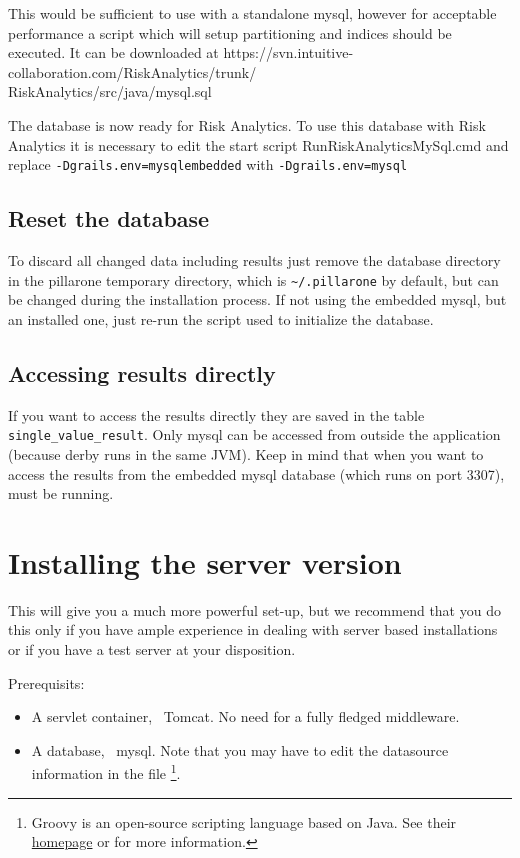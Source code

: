 This would be sufficient to use \RA{} with a standalone mysql, however for acceptable performance a script which will setup partitioning and indices should be executed.
It can be downloaded at https://svn.intuitive-collaboration.com/RiskAnalytics/trunk/
\\%
RiskAnalytics/src/java/mysql.sql

The database is now ready for Risk Analytics. To use this database with Risk Analytics it is necessary to edit the start script RunRiskAnalyticsMySql.cmd
and replace \texttt{-Dgrails.env=mysqlembedded} with \texttt{-Dgrails.env=mysql}

\subsection{Reset the database}

To discard all changed data including results just remove the database directory in the pillarone temporary directory, which is \texttt{\~{}/.pillarone} by default, but can be changed during the installation process.
If not using the embedded mysql, but an installed one, just re-run the script used to initialize the database.

\subsection{Accessing results directly} 

If you want to access the results directly they are saved in the table \texttt{single\_value\_result}. Only mysql can be accessed from outside the application (because derby runs in the same JVM).
Keep in mind that when you want to access the results from the embedded mysql database (which runs on port 3307), \RA{} must be running. 

\section{Installing the server version}
\label{sec:refguide-install-server}

This will give you a much more powerful set-up, but we recommend that you do this only if you have ample experience in dealing with server based installations or if you have a test server at your disposition.

Prerequisits: 
\begin{itemize}
	\item A servlet container, \eg~Tomcat. No need for a fully fledged middleware.
	\item A database, \eg~mysql. Note that you may have to edit the datasource 
		information in the file %
		\footnote{Groovy 
			is an open-source scripting language based on Java.
			See their \href{http://groovy.codehaus.org/}{homepage} 
			or \cite{GroovyIA07} for more information.}.
\end{itemize}



